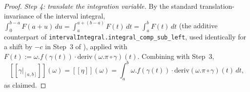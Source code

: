 \begin{proof}
  \emph{Step 4: translate the integration variable.} By the standard translation-invariance of the
  interval integral, $\int_0^{b-a} F(a+u)\,du = \int_a^{a+(b-a)} F(t)\,dt = \int_a^b F(t)\,dt$ (the
  additive counterpart of \texttt{intervalIntegral.integral\_comp\_sub\_left}, used identically for a
  shift by $-c$ in Step~3 of ), applied with $F(t) :=
  \omega.f(\gamma(t))\cdot\mathrm{deriv}(\omega.\pi\circ\gamma)(t)$. Combining with Step~3,
  \[
    [[\gamma|_{[a,b]}]](\omega) = [[\eta]](\omega) = \int_a^b \omega.f(\gamma(t)) \cdot
      \mathrm{deriv}(\omega.\pi\circ\gamma)(t)\,dt
    ,
  \]
  as claimed.
\end{proof}
